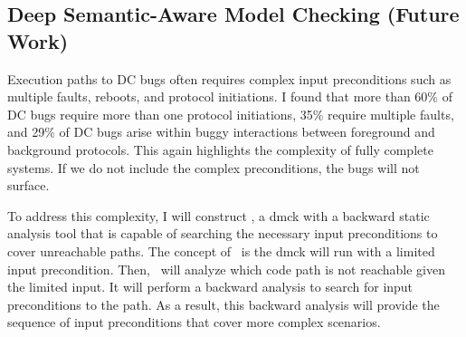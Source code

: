\documentclass[11pt]{article}
\begin{document}
\subsection{Deep Semantic-Aware Model Checking (Future Work)}

Execution paths to DC bugs often requires complex input preconditions such as
multiple faults, reboots, and protocol initiations. I found that more than 60\%
of DC bugs require more than one protocol initiations, 35\% require multiple
faults, and 29\% of DC bugs arise within buggy interactions between foreground
and background protocols.  This again highlights the complexity of fully
complete systems. If we do not include the complex preconditions, the bugs will
not surface.

To address this complexity, I will construct \deepcheck, a dmck with a backward
static analysis tool that is capable of searching the necessary input
preconditions to cover unreachable paths. The concept of \deepcheck\ is the dmck
will run with a limited input precondition. Then, \deepcheck\ will analyze which
code path is not reachable given the limited input. It will perform a backward
analysis to search for input preconditions to the path. As a result, this
backward analysis will provide the sequence of input preconditions that cover
more complex scenarios.


\end{document}
